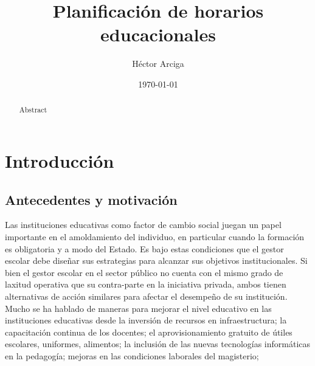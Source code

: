 \documentclass[draft,12pt,headsepline,footsepline,paper=letter]{scrreprt}
\begin{document}
\title{Planificación de horarios educacionales}
\author{Héctor Arciga}
\date{\today}

\maketitle

\begin{abstract}
Abstract 
\end{abstract}

\begin{spacing}{1}
\tableofcontents
\glsaddall 
\printglossaries
\listoffigures
\listoftables
\end{spacing}

\chapter{Introducción}

\section{Antecedentes y motivación}

Las instituciones educativas como factor de cambio social juegan un papel importante en el amoldamiento del individuo, en particular cuando la formación es obligatoria y a modo del Estado. Es bajo estas condiciones que el gestor escolar debe diseñar sus estrategias para alcanzar sus objetivos institucionales. 
Si bien el gestor escolar en el sector público no cuenta con el mismo grado de laxitud operativa que su contra-parte en la iniciativa privada, ambos tienen alternativas de acción similares para afectar el desempeño de su institución.
Mucho se ha hablado de maneras para mejorar el nivel educativo en las instituciones educativas desde la inversión de recursos en infraestructura; la capacitación continua de los docentes; el aprovisionamiento gratuito de útiles escolares, uniformes, alimentos; la  inclusión de las nuevas tecnologías informáticas en la pedagogía; mejoras en las condiciones laborales del magisterio;

\end{document}
